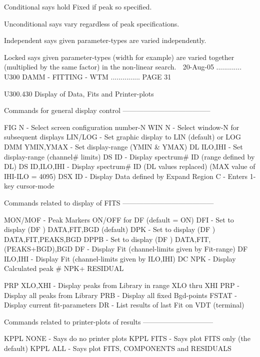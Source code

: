    Conditional says hold Fixed if peak so specified.
 
   Unconditional says vary regardless of peak specifications.
 
   Independent says given parameter-types are varied independently.
 
   Locked  says  given parameter-types (width for example) are varied together
          (multiplied by the same factor) in the non-linear search.
    
   20-Aug-05 ............. U300  DAMM - FITTING - WTM ............... PAGE  31
 
   U300.430  Display of Data, Fits and Printer-plots
 
   Commands for general display control --------------------------------------
 
   FIG    N           - Select screen configuration number-N
   WIN    N           - Select window-N for subsequent displays
   LIN/LOG            - Set graphic display to LIN (default) or LOG
   DMM    YMIN,YMAX   - Set display-range (YMIN & YMAX)
   DL     ILO,IHI     - Set display-range (channel# limits)
   DS     ID          - Display spectrum# ID (range defined by DL)
   DS     ID,ILO,IHI  - Display spectrum# ID (DL values replaced)
                        (MAX value of IHI-ILO = 4095)
   DSX    ID          - Display Data defined by Expand Region
   C                  - Enters 1-key cursor-mode
 
   Commands related to display of FITS ---------------------------------------
 
   MON/MOF            - Peak Markers ON/OFF for DF (default = ON)
   DFI                - Set to display (DF ) DATA,FIT,BGD (default)
   DPK                - Set to display (DF ) DATA,FIT,PEAKS,BGD
   DPPB               - Set to display (DF ) DATA,FIT,(PEAKS+BGD),BGD
   DF                 - Display Fit (channel-limits given by Fit-range)
   DF     ILO,IHI     - Display Fit (channel-limits given by ILO,IHI)
   DC     NPK         - Display Calculated peak #  NPK+ RESIDUAL
 
   PRP    XLO,XHI     - Display peaks from Library in range XLO thru XHI
   PRP                - Display all peaks from Library
   PRB                - Display all fixed Bgd-points
   FSTAT              - Display current fit-parameters
   DR                 - List results of last Fit on VDT (terminal)
 
   Commands related to printer-plots of results ------------------------------
 
   KPPL   NONE        - Says do no printer plots
   KPPL   FITS        - Says plot FITS only (the default)
   KPPL   ALL         - Says plot FITS, COMPONENTS and RESIDUALS
 
